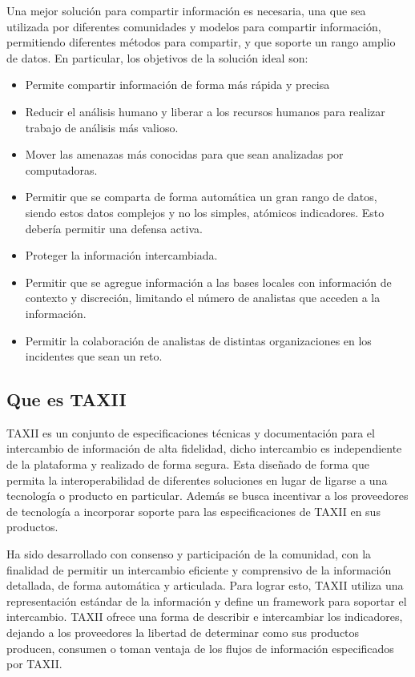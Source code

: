 Una mejor solución para compartir información es necesaria, una que sea 
utilizada por diferentes comunidades y modelos para compartir información, 
permitiendo diferentes métodos para compartir, y que soporte un rango amplio de 
datos. En particular, los objetivos de la solución ideal son:
\begin{itemize}
  \item Permite compartir información de forma más rápida y precisa
  \item Reducir el análisis humano y liberar a los recursos humanos para 
  realizar trabajo de análisis más valioso.
  \item Mover las amenazas más conocidas para que sean analizadas por 
  computadoras.
  \item Permitir que se comparta de forma automática un gran rango de datos, 
  siendo estos datos complejos y no los simples, atómicos indicadores. Esto 
  debería permitir una defensa activa.
  \item Proteger la información intercambiada.
  \item Permitir que se agregue información a las bases locales con información de contexto y 
  discreción, limitando el número de analistas que acceden a la información.
  \item Permitir la colaboración de analistas de distintas organizaciones en los 
  incidentes que sean un reto.
  \end{itemize}
  
 \subsection{Que es TAXII}
 TAXII es un conjunto de especificaciones técnicas y documentación para el 
 intercambio de información de alta fidelidad, dicho intercambio es 
 independiente de la plataforma y realizado de forma segura. Esta diseñado de 
 forma que permita la interoperabilidad de diferentes soluciones en lugar de 
 ligarse a una tecnología o producto en particular. Además se busca incentivar a 
 los proveedores de tecnología a incorporar soporte para las especificaciones de 
 TAXII en sus productos.
 
 Ha sido desarrollado con consenso y participación de la comunidad, con la 
 finalidad de permitir un intercambio eficiente y comprensivo de la 
 información detallada, de forma automática y articulada. Para lograr esto, 
 TAXII utiliza una representación estándar de la información y define un 
 framework para soportar el intercambio. TAXII ofrece una forma de describir e 
 intercambiar los indicadores, dejando a los proveedores la libertad de 
 determinar como sus productos producen, consumen o toman ventaja de los flujos 
 de información especificados por TAXII.
 

